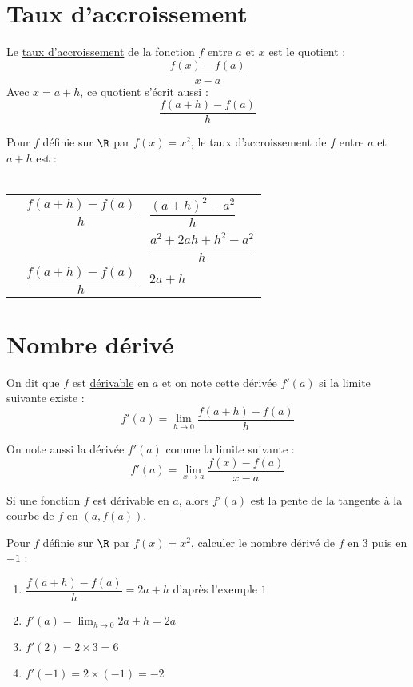 \documentclass[12pt]{article}
\begin{document}
\setlength{\parindent}{0cm} 


\section{Taux d'accroissement} 

\begin{definition}
   Le \underline{taux d'accroissement} de la fonction $f$ entre $a$ et $x$ est le quotient :
$$\dfrac{f(x)-f(a)}{x-a}$$
Avec $x=a+h$, ce quotient s'écrit aussi : $$\dfrac{f(a+h)-f(a)}{h}$$
\end{definition}

\begin{exemple}
   Pour $f$ définie sur $\R$ par $f(x)=x^2$, le taux d'accroissement
   de $f$ entre $a$ et $a+h$ est : \\ \\
   \begin{tabular}{p{0.3cm}l!{=}l}
      &  $\dfrac{f(a+h)-f(a)}{h}$ & $\dfrac{(a+h)^2-a^2}{h}$ \\
      & & $\dfrac{a^2+2ah+h^2-a^2}{h}$ \\
      &   $\dfrac{f(a+h)-f(a)}{h}$ & $2a+h$ \\
   \end{tabular}
\end{exemple}

\section{Nombre dérivé} 

\begin{definition}
   On dit que $f$ est \underline{dérivable} en $a$ et on note cette dérivée $f'(a)$ si la limite suivante existe :
$$f'(a)=\lim_{h\to0}\frac{f(a+h)-f(a)}{h}$$
\end{definition}

\begin{remarque}
   On note aussi la dérivée $f'(a)$ comme la limite suivante :
$$f'(a)=\lim_{x\to a}\frac{f(x)-f(a)}{x-a}$$
\end{remarque}

\begin{propriete}
  Si une fonction $f$ est dérivable en $a$, alors $f'(a)$ est la pente de la
  tangente à la courbe de $f$ en $(a, f(a))$.
\end{propriete}

\begin{exemple}
  Pour $f$ définie sur $\R$ par $f(x)=x^2$, calculer le nombre dérivé de $f$ en $3$ puis en $-1$ :
   \begin{enumerate}
      \item $\dfrac{f(a+h)-f(a)}{h}=2a+h$ d'après l'exemple $1$
      \item $f'(a)=\lim_{h\to0}2a+h=2a $
      \item $f'(2)=2\times 3=6$
      \item $f'(-1)=2\times (-1)=-2$
   \end{enumerate}
\end{exemple}
\end{document}
